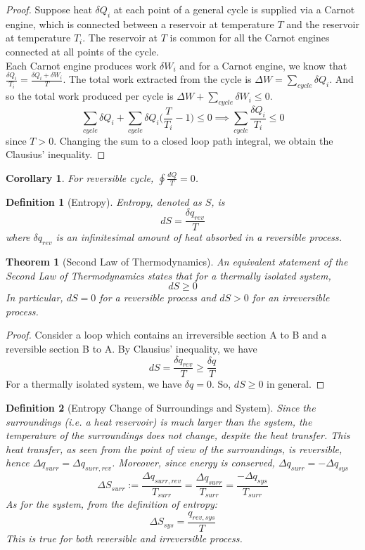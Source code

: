 \documentclass[a4paper]{article}
\newtheorem{defi}{Definition}[section]
\newtheorem{thm}{Theorem}[section]
\newtheorem{cor}{Corollary}[section]
\theoremstyle{new}
\begin{document}
\begin{proof}
Suppose heat $\delta Q_i$ at each point of a general cycle is supplied via a Carnot engine, which is connected between a reservoir at temperature $T$ and the reservoir at temperature $T_i$. The reservoir at $T$ is common for all the Carnot engines connected at all points of the cycle.\\[5pt]
Each Carnot engine produces work $\delta W_i$ and for a Carnot engine, we know that $\frac{\delta Q_i}{T_i}=\frac{\delta Q_i+\delta W_i}{T}$. The total work extracted from the cycle is $\Delta W=\sum_{cycle}\delta Q_i$. And so the total work produced per cycle is $\Delta W+\sum_{cycle}\delta W_i\leq 0$.
$$\sum_{cycle}\delta Q_i+\sum_{cycle}\delta Q_i\bigg(\frac{T}{T_i}-1\bigg)\leq0\implies \sum_{cycle}\frac{\delta Q_i}{T_i}\leq 0$$
since $T>0$. Changing the sum to a closed loop path integral, we obtain the Clausius' inequality.
\end{proof}
\begin{cor}
For reversible cycle, $\oint\frac{dQ}{T}=0$.
\end{cor}
\begin{defi}[Entropy]
Entropy, denoted as $S$, is $$dS=\frac{\delta q_{rev}}{T}$$ where $\delta q_{rev}$ is an infinitesimal amount of heat absorbed in a reversible process. 
\end{defi}
\begin{thm}[Second Law of Thermodynamics]
An equivalent statement of the Second Law of Thermodynamics states that for a thermally isolated system,
$$dS\geq0$$
In particular, $dS=0$ for a reversible process and $dS>0$ for an irreversible process.
\end{thm}
\begin{proof}
Consider a loop which contains an irreversible section A to B and a reversible section B to A. By Clausius' inequality, we have
$$dS=\frac{\delta q_{rev}}{T}\geq\frac{\delta q}{T}$$
For a thermally isolated system, we have $\delta q=0$. So, $dS\geq0$ in general.
\end{proof}
\begin{defi}[Entropy Change of Surroundings and System]
Since the surroundings (i.e. a heat reservoir) is much larger than the system, the temperature of the surroundings does not change, despite the heat transfer. This heat transfer, as seen from the point of view of the surroundings, is reversible, hence $\Delta q_{surr}=\Delta q_{surr,rev}$. Moreover, since energy is conserved, $\Delta q_{surr}=-\Delta q_{sys}$
$$\Delta S_{surr}:=\frac{\Delta q_{surr,rev}}{T_{surr}}=\frac{\Delta q_{surr}}{T_{surr}}=\frac{-\Delta q_{sys}}{T_{surr}}$$
As for the system, from the definition of entropy:
$$\Delta S_{sys}=\frac{q_{rev,sys}}{T}$$
This is true for both reversible and irreversible process.
\end{defi}
\end{document}
